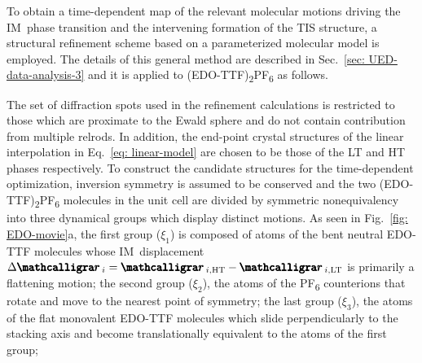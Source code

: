 To obtain a time-dependent map of the relevant molecular motions driving
the IM~phase transition and the intervening formation of the TIS structure,
a structural refinement scheme based on a parameterized molecular model is employed.
The details of this general method are described in Sec.~\ref{sec: UED-data-analysis-3}
and it is applied to (EDO-TTF)\textsubscript{2}PF\textsubscript{6} as follows.

The set of diffraction spots used in the refinement calculations is restricted to those
which are proximate to the Ewald sphere and do not contain contribution from multiple relrods.
%
In addition, the end-point crystal structures of the linear interpolation in Eq.~\eqref{eq: linear-model}
are chosen to be those of the LT and HT phases respectively.
%
To construct the candidate structures for the time-dependent optimization,
inversion symmetry is assumed to be conserved and
the two (EDO-TTF)\textsubscript{2}PF\textsubscript{6} molecules in the unit cell
are divided by symmetric nonequivalency into three dynamical groups which display distinct motions.
%
As seen in Fig.~\ref{fig: EDO-movie}a,
the first group ($\xi_1$) is composed of atoms of the bent neutral EDO-TTF molecules
whose IM~displacement $\Delta \bscriptr_{i} = \bscriptr_{i, \text{HT}} - \bscriptr_{i, \text{LT}}$
is primarily a flattening motion;
%
the second group ($\xi_2$), the atoms of the PF\textsubscript{6} counterions that rotate and
move to the nearest point of symmetry;
%
the last group ($\xi_3$), the atoms of the flat monovalent EDO-TTF molecules
which slide perpendicularly to the stacking axis
and become translationally equivalent to the atoms of the first group;
%
